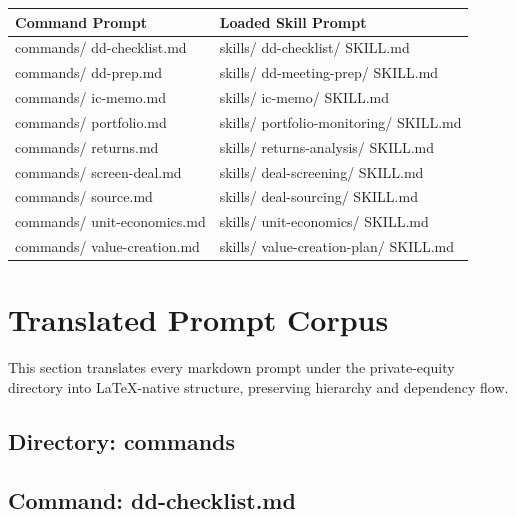 \documentclass[11pt]{article}
\begin{document}
\begingroup
\small
\setlength{\tabcolsep}{2pt}
\begin{longtable}{>{\RaggedRight\arraybackslash\hspace{0pt}}p{}>{\RaggedRight\arraybackslash\hspace{0pt}}p{}}
\toprule
{} \textbf{Command Prompt} & \textbf{Loaded Skill Prompt} \\
\midrule
{} commands/ dd-checklist.md & skills/ dd-checklist/ SKILL.md \\
{} commands/ dd-prep.md & skills/ dd-meeting-prep/ SKILL.md \\
{} commands/ ic-memo.md & skills/ ic-memo/ SKILL.md \\
{} commands/ portfolio.md & skills/ portfolio-monitoring/ SKILL.md \\
{} commands/ returns.md & skills/ returns-analysis/ SKILL.md \\
{} commands/ screen-deal.md & skills/ deal-screening/ SKILL.md \\
{} commands/ source.md & skills/ deal-sourcing/ SKILL.md \\
{} commands/ unit-economics.md & skills/ unit-economics/ SKILL.md \\
{} commands/ value-creation.md & skills/ value-creation-plan/ SKILL.md \\
\bottomrule
\end{longtable}
\endgroup

\newpage

\section{Translated Prompt Corpus}

This section translates every markdown prompt under the private-equity directory into LaTeX-native structure, preserving hierarchy and dependency flow.

\subsection{Directory: commands}

\subsection{Command: dd-checklist.md}\label{file:commands-dd-checklist.md}
\end{document}
